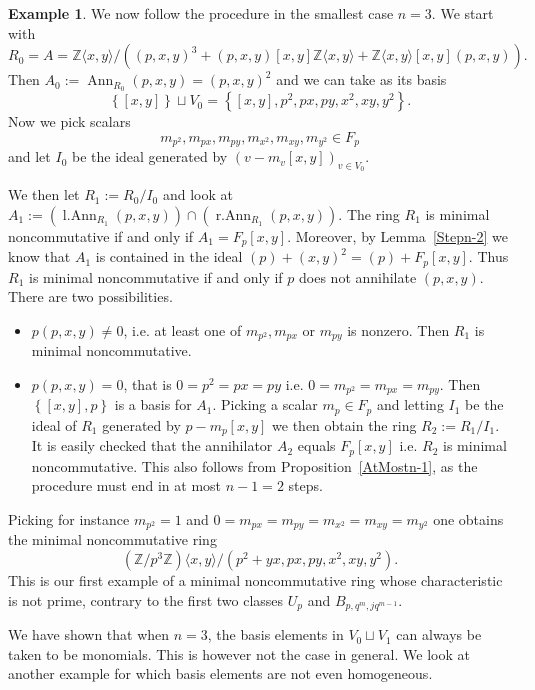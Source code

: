 \documentclass[11pt]{article}
\DeclareMathOperator{\Ann}{Ann}
\DeclareMathOperator{\lAnn}{l.Ann}
\DeclareMathOperator{\rAnn}{r.Ann}
\theoremstyle{definition}
\newtheorem{numberedexample}[corollary]{Example}
\begin{document}
\begin{numberedexample}\label{Generaln=3}
We now follow the procedure in the smallest case $n=3$. We start with
\[R_0=A=\mathbb{Z}\langle x,y\rangle/\left((p,x,y)^3+(p,x,y)[x,y]\mathbb{Z}\langle x,y\rangle+\mathbb{Z}\langle x,y\rangle[x,y](p,x,y)\right).\]
Then $A_0:=\Ann_{R_0}(p,x,y)=(p,x,y)^2$ and we can take as its basis
\[\left\lbrace [x,y]\right\rbrace\sqcup V_0=\left\lbrace [x,y],p^2,px,py,x^2,xy,y^2\right\rbrace.\]
Now we pick scalars
\[m_{p^2},m_{px},m_{py},m_{x^2},m_{xy},m_{y^2}\in F_p\]
and let $I_0$ be the ideal generated by $\left(v-m_v[x,y]\right)_{v\in V_0}$.

We then let $R_1:=R_0/I_0$ and look at $A_1:=\left(\lAnn_{R_1}(p,x,y)\right)\cap\left(\rAnn_{R_1}(p,x,y)\right)$. The ring $R_1$ is minimal noncommutative if and only if $A_1=F_p[x,y]$. Moreover, by Lemma~\ref{Stepn-2} we know that $A_1$ is contained in the ideal $(p)+(x,y)^2=(p)+F_p[x,y]$. Thus $R_1$ is minimal noncommutative if and only if $p$ does not annihilate $(p,x,y)$. There are two possibilities.

\begin{itemize}[topsep=0pt]
\item[(1)] $p(p,x,y)\neq 0$, i.e. at least one of $m_{p^2},m_{px}$ or $m_{py}$ is nonzero. Then $R_1$ is minimal noncommutative.
\item[(2)] $p(p,x,y)=0$, that is $0=p^2=px=py$ i.e. $0=m_{p^2}=m_{px}=m_{py}$. Then $\left\lbrace [x,y],p\right\rbrace$ is a basis for $A_1$. Picking a scalar $m_p\in F_p$ and letting $I_1$ be the ideal of $R_1$ generated by $p-m_p[x,y]$ we then obtain the ring $R_2:=R_1/I_1$. It is easily checked that the annihilator $A_2$ equals $F_p[x,y]$ i.e. $R_2$ is minimal noncommutative. This also follows from Proposition~\ref{AtMostn-1}, as the procedure must end in at most $n-1=2$ steps.
\end{itemize}

Picking for instance $m_{p^2}=1$ and $0=m_{px}=m_{py}=m_{x^2}=m_{xy}=m_{y^2}$ one obtains the minimal noncommutative ring
\[\left(\mathbb{Z}/p^3\mathbb{Z}\right)\langle x,y\rangle/\left(p^2+yx,px,py,x^2,xy,y^2\right).\]
This is our first example of a minimal noncommutative ring whose characteristic is not prime, contrary to the first two classes $U_p$ and $B_{p,q^m,jq^{m-1}}$.
\end{numberedexample}

We have shown that when $n=3$, the basis elements in $V_0\sqcup V_1$ can always be taken to be monomials. This is however not the case in general. We look at another example for which basis elements are not even homogeneous.
\end{document}

